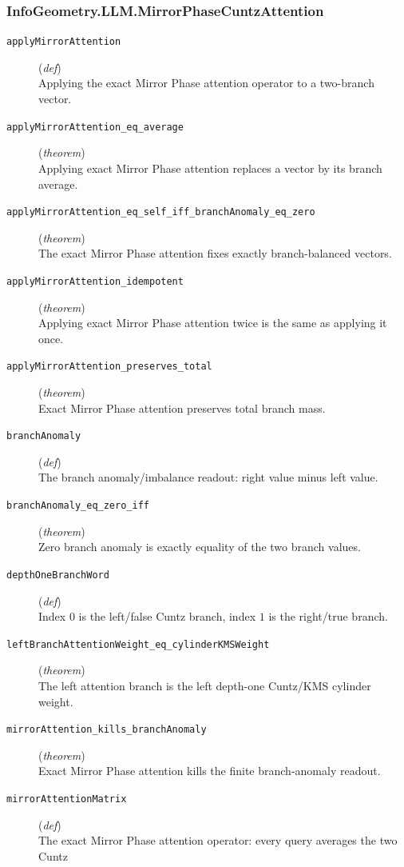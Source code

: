 \documentclass[11pt,a4paper]{article}
\begin{document}
\subsubsection*{InfoGeometry.LLM.MirrorPhaseCuntzAttention}
\begin{description}
  \item[\texttt{applyMirrorAttention}] (\textit{def}) \\ Applying the exact Mirror Phase attention operator to a two-branch vector.
  \item[\texttt{applyMirrorAttention\_eq\_average}] (\textit{theorem}) \\ Applying exact Mirror Phase attention replaces a vector by its branch average.
  \item[\texttt{applyMirrorAttention\_eq\_self\_iff\_branchAnomaly\_eq\_zero}] (\textit{theorem}) \\ The exact Mirror Phase attention fixes exactly branch-balanced vectors.
  \item[\texttt{applyMirrorAttention\_idempotent}] (\textit{theorem}) \\ Applying exact Mirror Phase attention twice is the same as applying it once.
  \item[\texttt{applyMirrorAttention\_preserves\_total}] (\textit{theorem}) \\ Exact Mirror Phase attention preserves total branch mass.
  \item[\texttt{branchAnomaly}] (\textit{def}) \\ The branch anomaly/imbalance readout: right value minus left value.
  \item[\texttt{branchAnomaly\_eq\_zero\_iff}] (\textit{theorem}) \\ Zero branch anomaly is exactly equality of the two branch values.
  \item[\texttt{depthOneBranchWord}] (\textit{def}) \\ Index $0$ is the left/false Cuntz branch, index $1$ is the right/true branch.
  \item[\texttt{leftBranchAttentionWeight\_eq\_cylinderKMSWeight}] (\textit{theorem}) \\ The left attention branch is the left depth-one Cuntz/KMS cylinder weight.
  \item[\texttt{mirrorAttention\_kills\_branchAnomaly}] (\textit{theorem}) \\ Exact Mirror Phase attention kills the finite branch-anomaly readout.
  \item[\texttt{mirrorAttentionMatrix}] (\textit{def}) \\ The exact Mirror Phase attention operator: every query averages the two Cuntz 

\end{description}
\end{document}
